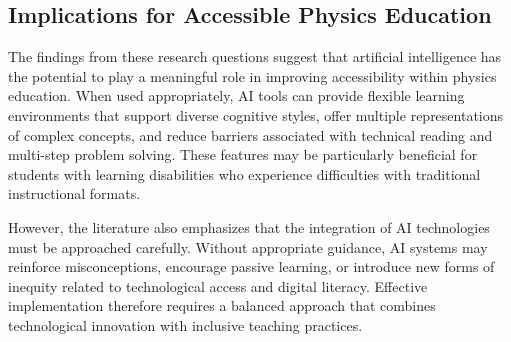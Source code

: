 \documentclass[]{aastex701}
\begin{document}
\subsection{Implications for Accessible Physics Education}

The findings from these research questions suggest that artificial intelligence has the potential to play a meaningful role in improving accessibility within physics education. When used appropriately, AI tools can provide flexible learning environments that support diverse cognitive styles, offer multiple representations of complex concepts, and reduce barriers associated with technical reading and multi-step problem solving. These features may be particularly beneficial for students with learning disabilities who experience difficulties with traditional instructional formats.

However, the literature also emphasizes that the integration of AI technologies must be approached carefully. Without appropriate guidance, AI systems may reinforce misconceptions, encourage passive learning, or introduce new forms of inequity related to technological access and digital literacy. Effective implementation therefore requires a balanced approach that combines technological innovation with inclusive teaching practices.
\end{document}
